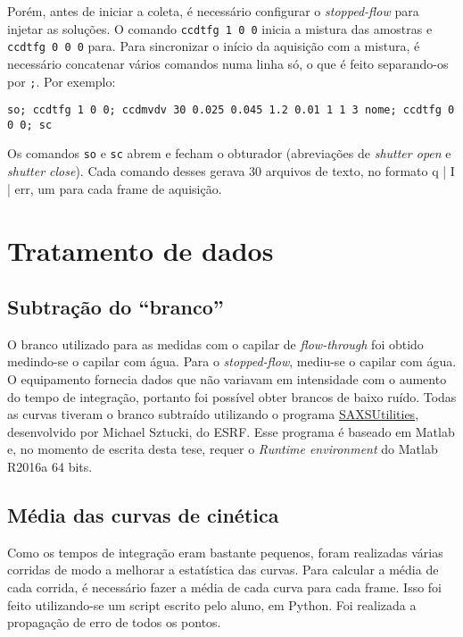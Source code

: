 			Porém, antes de iniciar a coleta, é necessário configurar o \emph{stopped-flow} para injetar as soluções. O comando \texttt{ccdtfg 1 0 0} inicia a mistura das amostras e \texttt{ccdtfg 0 0 0} para. Para sincronizar o início da aquisição com a mistura, é necessário concatenar vários comandos numa linha só, o que é feito separando-os por \texttt{;}. Por exemplo:
			
			\begin{center}
				\begin{footnotesize}
					\texttt{so; ccdtfg 1 0 0; ccdmvdv 30 0.025 0.045 1.2 0.01 1 1 3 nome; ccdtfg 0 0 0; sc}
				\end{footnotesize}
			\end{center}
	
			Os comandos \texttt{so} e \texttt{sc} abrem e fecham o obturador (abreviações de \emph{shutter open} e \emph{shutter close}). Cada comando desses gerava 30 arquivos de texto, no formato q | I | err, um para cada frame de aquisição. 

		\section{Tratamento de dados}
			\subsection{Subtração do ``branco''}
			
			O branco utilizado para as medidas com o capilar de \emph{flow-through} foi obtido medindo-se o capilar com água. Para o \emph{stopped-flow}, mediu-se o capilar com água. O equipamento fornecia dados que não variavam em intensidade com o aumento do tempo de integração, portanto foi possível obter brancos de baixo ruído. Todas as curvas tiveram o branco subtraído utilizando o programa \href{http://www.sztucki.de/SAXSutilities/}{SAXSUtilities}, desenvolvido por Michael Sztucki, do ESRF. Esse programa é baseado em Matlab e, no momento de escrita desta tese, requer o \emph{Runtime environment} do Matlab R2016a 64 bits.
			
			\subsection{Média das curvas de cinética}
			
			Como os tempos de integração eram bastante pequenos, foram realizadas várias corridas de modo a melhorar a estatística das curvas. Para calcular a média de cada corrida, é necessário fazer a média de cada curva para cada frame. Isso foi feito utilizando-se um script escrito pelo aluno, em Python. Foi realizada a propagação de erro de todos os pontos. %
			
